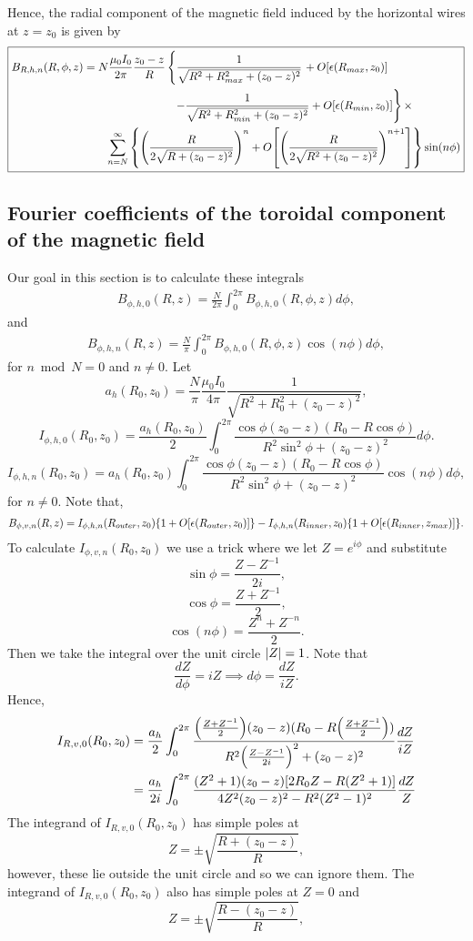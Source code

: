\documentclass{article}
\begin{document}
Hence, the radial component of the magnetic field induced by the horizontal wires at $z=z_0$
is given by
\[
\boxed{
\begin{aligned}
B_{R,h,n}(R, \phi, z) &= N\frac{\mu_0I_0}{2\pi}\frac{z_0-z}{R}\left\{\frac{1}{\sqrt{R^2+R_{max}^2+(z_0-z)^2}}\right. + O[\epsilon(R_{max}, z_0)] \\
&\qquad\qquad\qquad\qquad\left.-\frac{1}{\sqrt{R^2+R_{min}^2+(z_0-z)^2}} + O[\epsilon(R_{min}, z_0)]\right\}\times \\
&\qquad\sum_{n=N}^{\infty}\qty{\qty(\frac{R}{2\sqrt{R+(z_0-z)^2}})^{n}+O\qty[\qty(\frac{R}{2\sqrt{R^2+(z_0-z)^2}})^{n+1}]}\sin(n\phi)
\end{aligned}
}
\]

\subsection{Fourier coefficients of the toroidal component of the magnetic field}

Our goal in this section is to calculate these integrals
\[\begin{aligned}
B_{\phi, h, 0}(R, z)= \frac{N}{2\pi}\int_0^{2\pi} B_{\phi, h, 0}(R, \phi, z)d\phi,
\end{aligned}\]
and
\[\begin{aligned}
B_{\phi, h, n}(R, z)= \frac{N}{\pi}\int_0^{2\pi} B_{\phi, h, 0}(R, \phi, z)\cos(n\phi)d\phi,
\end{aligned}\]
for $n \bmod N = 0$ and $n\ne0$.
Let
\[a_h(R_0, z_0)=\frac{N}{\pi}\frac{\mu_0 I_0}{4\pi}\frac{1}{\sqrt{R^2+R_0^2+(z_0-z)^2}},\]
\[I_{\phi,h,0}(R_0, z_0) = \frac{a_h(R_0, z_0)}{2}\int_0^{2\pi}\frac{\cos\phi(z_0-z)(R_0-R\cos\phi)}{R^2\sin^2\phi+(z_0-z)^2} d\phi.\]
\[I_{\phi,h,n}(R_0, z_0) = a_h(R_0, z_0)\int_0^{2\pi}\frac{\cos\phi(z_0-z)(R_0-R\cos\phi)}{R^2\sin^2\phi+(z_0-z)^2}\cos(n\phi) d\phi,\]
for $n\ne 0$.
Note that,
\[\begin{aligned}
B_{\phi, v, n}(R, z)= I_{\phi,h,n}(R_{outer}, z_0)\qty{1+O[\epsilon(R_{outer}, z_0)]} - I_{\phi,h,n}(R_{inner}, z_0)\qty{1+O[\epsilon(R_{inner}, z_{max})]}.
\end{aligned}\]
To calculate $I_{\phi,v,n}(R_0, z_0)$  we use a trick where we let $Z=e^{i\phi}$ and substitute
\[\sin\phi = \frac{Z-Z^{-1}}{2i},\]
\[\cos\phi = \frac{Z+Z^{-1}}{2},\]
\[\cos(n\phi) = \frac{Z^n+Z^{-n}}{2}.\]
Then we take the integral over the unit circle $\abs{Z}=1$.
Note that
\[\frac{dZ}{d\phi} = iZ \implies d\phi = \frac{dZ}{iZ}.\]
Hence,
\[\begin{aligned}
I_{R,v,0}(R_0, z_0) &= \frac{a_h}{2}\int_0^{2\pi}\frac{\qty(\frac{Z+Z^{-1}}{2})(z_0-z)(R_0-R\qty(\frac{Z+Z^{-1}}{2}))}{R^2\qty(\frac{Z-Z^{-1}}{2i})^2+(z_0-z)^2} \frac{dZ}{iZ} \\
&= \frac{a_h}{2i}\int_0^{2\pi}\frac{(Z^2+1)(z_0-z)[2R_0Z-R(Z^2+1)]}{4Z^2(z_0-z)^2-R^2(Z^2-1)^2} \frac{dZ}{Z}\\
\end{aligned}\]
The integrand of $I_{R,v,0}(R_0, z_0)$ has simple poles at
\[Z=\pm\sqrt{\frac{R+(z_0-z)}{R}},\]
however, these lie outside the unit circle and so we can ignore them.
The integrand of $I_{R,v,0}(R_0, z_0)$ also has simple poles at $Z=0$ and
\[Z=\pm\sqrt{\frac{R-(z_0-z)}{R}},\]
\end{document}
